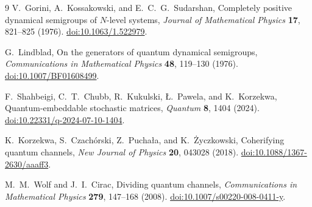 \documentclass[UTF8,11pt,a4paper,fontset=fandol]{ctexart}
\theoremstyle{definition}
\theoremstyle{remark}
\begin{document}
\begin{thebibliography}{9}
V.~Gorini, A.~Kossakowski, and E.~C.~G.~Sudarshan,
Completely positive dynamical semigroups of \(N\)-level systems,
\emph{Journal of Mathematical Physics} \textbf{17}, 821--825 (1976).
\href{https://doi.org/10.1063/1.522979}{doi:10.1063/1.522979}.

G.~Lindblad,
On the generators of quantum dynamical semigroups,
\emph{Communications in Mathematical Physics} \textbf{48}, 119--130 (1976).
\href{https://doi.org/10.1007/BF01608499}{doi:10.1007/BF01608499}.

F.~Shahbeigi, C.~T.~Chubb, R.~Kukulski, {\L}.~Pawela, and K.~Korzekwa,
Quantum-embeddable stochastic matrices,
\emph{Quantum} \textbf{8}, 1404 (2024).
\href{https://doi.org/10.22331/q-2024-07-10-1404}{doi:10.22331/q-2024-07-10-1404}.

K.~Korzekwa, S.~Czach\'orski, Z.~Pucha\l a, and K.~\.{Z}yczkowski,
Coherifying quantum channels,
\emph{New Journal of Physics} \textbf{20}, 043028 (2018).
\href{https://doi.org/10.1088/1367-2630/aaaff3}{doi:10.1088/1367-2630/aaaff3}.

M.~M.~Wolf and J.~I.~Cirac,
Dividing quantum channels,
\emph{Communications in Mathematical Physics} \textbf{279}, 147--168 (2008).
\href{https://doi.org/10.1007/s00220-008-0411-y}{doi:10.1007/s00220-008-0411-y}.
\end{thebibliography}
\end{document}

